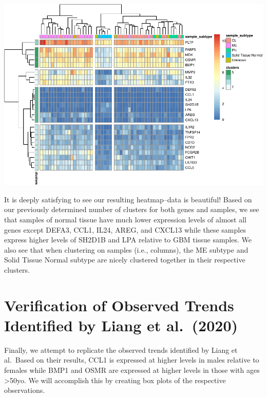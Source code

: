 \documentclass[
]{article}
\begin{document}
\includegraphics{LiuKevin_Final_Project_files/figure-latex/unnamed-chunk-16-1.pdf}

It is deeply satisfying to see our resulting heatmap--data is beautiful!
Based on our previously determined number of clusters for both genes and
samples, we see that samples of normal tissue have much lower expression
levels of almost all genes except DEFA3, CCL1, IL24, AREG, and CXCL13
while these samples express higher levels of SH2D1B and LPA relative to
GBM tissue samples. We also see that when clustering on samples (i.e.,
columns), the ME subtype and Solid Tissue Normal subtype are nicely
clustered together in their respective clusters.

\newpage

\hypertarget{verification-of-observed-trends-identified-by-liang-et-al.-2020}{%
\section{Verification of Observed Trends Identified by Liang et
al.~(2020)}\label{verification-of-observed-trends-identified-by-liang-et-al.-2020}}

Finally, we attempt to replicate the observed trends identified by Liang
et al.~Based on their results, CCL1 is expressed at higher levels in
males relative to females while BMP1 and OSMR are expressed at higher
levels in those with ages \textgreater50yo. We will accomplish this by
creating box plots of the respective observations.
\end{document}
